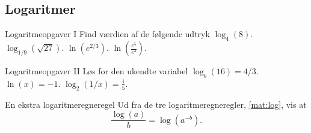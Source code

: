 \subsection*{Logaritmer}
\begin{opgave}{Logaritmeopgaver I}
    Find værdien af de følgende udtryk
    \opg $\log_{4}(8).$
    \opg $\log_{1/9}\left(\sqrt{27}\right).$
    \opg $\ln(e^{2/3}).$
    \opg $\ln(\frac{e^5}{e^3}).$
\end{opgave}
\begin{opgave}{Logaritmeopgaver II}
    Løs for den ukendte variabel
    \opg $\log_{b}(16) = 4/3.$
    \opg $\ln(x) = -1.$
    \opg $\log_{2}(1/x)=\frac{1}{5}.$
\end{opgave}
\begin{opgave}{En ekstra logaritmeregneregel}
    Ud fra de tre logaritmeregneregler, \eqref{mat:log}, vis at
    $$
    \frac{\log(a)}{b}=\log(a^{-b}).
    $$
\end{opgave}